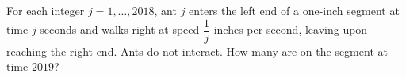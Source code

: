 For each integer $j=1,\ldots,2018$, ant $j$ enters the left end of a one-inch segment at time $j$ seconds and walks right at speed $\dfrac{1}{j}$ inches per second, leaving upon reaching the right end. Ants do not interact. How many are on the segment at time $2019$?
